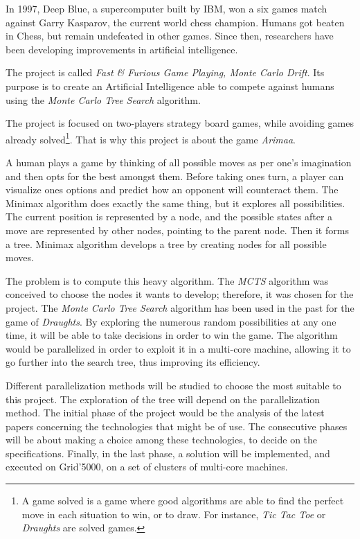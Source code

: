 
In 1997, Deep Blue, a supercomputer built by IBM, won a six games match against Garry Kasparov, the current world chess champion. Humans got beaten in Chess, but remain undefeated in other games. Since then, researchers have been developing improvements in artificial intelligence.
\newline

The project is called \emph{Fast \& Furious Game Playing, Monte Carlo Drift}. Its purpose is to create an Artificial Intelligence able to compete against humans using the \emph{Monte Carlo Tree Search} algorithm.
\newline

The project is focused on two-players strategy board games, while avoiding games already solved\footnote{A game solved is a game where good algorithms are able to find the perfect move in each situation to win, or to draw. For instance, \textit{Tic Tac Toe} or \textit{Draughts} are solved games.}. That is why this project is about the game \emph{Arimaa}.
\newline

A human plays a game by thinking of all possible moves as per one's imagination and then opts for the best amongst them. Before taking ones turn, a player can visualize ones options and predict how an opponent will counteract them. The Minimax algorithm does exactly the same thing, but it explores all possibilities. The current position is represented by a node, and the possible states after a move are represented by other nodes, pointing to the parent node. Then it forms a tree.
Minimax algorithm develops a tree by creating nodes for all possible moves.
\newline

The problem is to compute this heavy algorithm. The \emph{MCTS} algorithm was conceived to choose the nodes it wants to develop; therefore, it was chosen for the project.
The \emph{Monte Carlo Tree Search} algorithm has been used in the past for the game of \textit{Draughts}. By exploring the numerous random possibilities at any one time, it will be able to take decisions in order to win the game.
The algorithm would be parallelized in order to exploit it in a multi-core machine, allowing it to go further into the search tree, thus improving its efficiency.
\newline

Different parallelization methods will be studied to choose the most suitable to this project.
The exploration of the tree will depend on the parallelization method.
The initial phase of the project would be the analysis of the latest papers concerning the technologies that might be of use.
The consecutive phases will be about making a choice among these technologies, to decide on the specifications.
Finally, in the last phase, a solution will be implemented, and executed on Grid'5000, on a set of clusters of multi-core machines.
\newline

